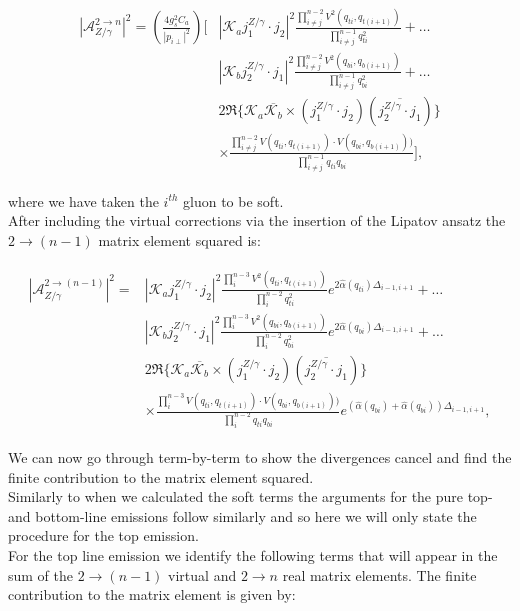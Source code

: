 		\begin{align}
		\begin{split}
			|\mathcal{A}_{Z/\gamma}^{2\rightarrow n}|^2 = \left(\frac{4g_s^2C_a}{|p_{i\perp}|^2}\right)
				\Bigg[&\left|\mathcal{K}_a j_1^{Z/\gamma}\cdot j_2\right|^2
				\frac{\prod^{n-2}_{i\neq j}V^2(q_{ti},
				q_{t(i+1)})}{\prod^{n-1}_{i\neq j}q^2_{ti}} + \ldots \\
				&\left|\mathcal{K}_b j_2^{Z/\gamma}\cdot j_1\right|^2
				\frac{\prod^{n-2}_{i\neq j}V^2(q_{bi}, q_{b(i+1)})}{\prod^{n-1}_{i\neq j}q^2_{bi}} + \ldots \\
				&2\Re\{\mathcal{K}_a\overline{\mathcal{K}_b} \times
				(j_1^{Z/\gamma}\cdot j_2)(\overline{j_2^{Z/\gamma}\cdot j_1})\}\\
				&\times\frac{\prod^{n-2}_{i\neq j}V(q_{ti}, q_{t(i+1)})\cdot V(q_{bi}, q_{b(i+1)}))}
				{\prod^{n-1}_{i\neq j}q_{ti}q_{bi}}\Bigg],
		\end{split}
		\end{align}

		where we have taken the $i^{th}$ gluon to be soft.\\After including the virtual corrections
		via the insertion of the Lipatov ansatz the $2\rightarrow (n-1)$ matrix element squared is:

		\begin{align}
		\begin{split}
			|\mathcal{A}_{Z/\gamma}^{2\rightarrow (n-1)}|^2 = &\left|\mathcal{K}_a j_1^{Z/\gamma}\cdot j_2\right|^2
				\frac{\prod^{n-3}_{i}V^2(q_{ti}, q_{t(i+1)})}{\prod^{n-2}_{i}q^2_{ti}}e^{2\hat{\alpha}(q_{ti})\Delta_{i-1,i+1}} + \ldots \\
				&\left|\mathcal{K}_b j_2^{Z/\gamma}\cdot j_1\right|^2 \frac{\prod^{n-3}_{i}V^2(q_{bi}, q_{b(i+1)})}
				{\prod^{n-2}_{i}q^2_{bi}}e^{2\hat{\alpha}(q_{bi})\Delta_{i-1,i+1}} + \ldots \\
				&2\Re\{\mathcal{K}_a\overline{\mathcal{K}_b} \times (j_1^{Z/\gamma}\cdot j_2)(\overline{j_2^{Z/\gamma}\cdot j_1})\}\\
				&\times\frac{\prod^{n-3}_{i}V(q_{ti}, q_{t(i+1)})\cdot V(q_{bi}, q_{b(i+1)}))}{\prod^{n-2}_{i}q_{ti}q_{bi}}
				e^{(\hat{\alpha}(q_{bi}) + \hat{\alpha}(q_{bi}))\Delta_{i-1,i+1}},
		\end{split}
		\end{align}

		We can now go through term-by-term to show the divergences cancel and find the finite contribution to
		the matrix element squared.\\Similarly to when we calculated the soft terms the arguments for the pure
		top- and bottom-line emissions follow similarly and so here we will only state the procedure for
		the top emission.\\For the top line emission we identify the following terms that will appear in the
		sum of the $2\rightarrow (n-1)$ virtual and $2\rightarrow n$ real matrix elements.  The finite
		contribution to the matrix element is given by:

